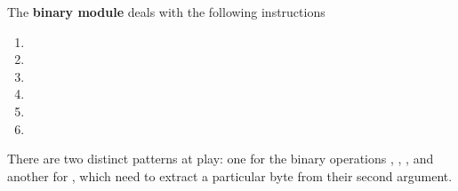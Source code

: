 The \textbf{binary module} deals with the following instructions
\begin{multicols}{3}
\begin{enumerate}
	\item {}
	\item {}
	\item {}
	\item {}
	\item {}
	\item {}
\end{enumerate}
\end{multicols}
There are two distinct patterns at play: one for the binary operations
,
,
,
and another for
,
which need to extract a particular byte from their second argument.
